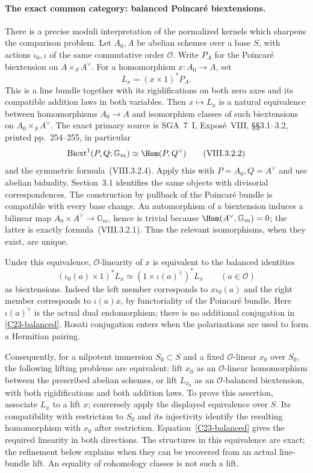 \documentclass[11pt]{article}
\theoremstyle{definition}\newtheorem{definition}[theorem]{Definition}\newtheorem{remark}[theorem]{Remark}
\begin{document}
\paragraph{The exact common category: balanced Poincar\'e biextensions.}
There is a precise moduli interpretation of the normalized
kernels which sharpens the comparison problem.  Let $A_0,A$
be abelian schemes over a base $S$, with actions $\iota_0,\iota$
of the same commutative order $\mathcal O$.  Write $P_A$
for the Poincar\'e biextension on $A\times_S A^\vee$.
For a homomorphism $x:A_0\to A$, set
\[
                   L_x=(x\times1)^*P_A.
\]
This is a line bundle together with its rigidifications on
both zero axes and its compatible addition laws in both
variables.  Then $x\mapsto L_x$ is a natural equivalence
between homomorphisms $A_0\to A$ and isomorphism classes of
such biextensions on $A_0\times_S A^\vee$.
The exact primary source is SGA~7~I, Expos\'e~VIII,
\S\S3.1--3.2, printed pp.~254--255, in particular
\[
 \operatorname{Biext}^1(P,Q;\mathbb G_m)
            \simeq\Hom(P,Q^\vee)
                         \tag{VIII.3.2.2}
\]
and the symmetric formula~(VIII.3.2.4).
Apply this with $P=A_0,Q=A^\vee$ and use abelian biduality.
Section~3.1 identifies the same objects with divisorial
correspondences.  The construction by pullback of the
Poincar\'e bundle is compatible with every base change.
An automorphism of a biextension induces a bilinear map
$A_0\times A^\vee\to\mathbb G_m$, hence is trivial because
$\Hom(A^\vee,\mathbb G_m)=0$; the latter is exactly
formula~(VIII.3.2.1).  Thus the relevant isomorphisms, when
they exist, are unique.

Under this equivalence, $\mathcal O$-linearity of $x$ is
equivalent to the balanced identities
\begin{equation}\label{C23-balanced}
 (\iota_0(a)\times1)^*L_x
       \simeq(1\times\iota(a)^\vee)^*L_x
                         \qquad(a\in\mathcal O)
\end{equation}
as biextensions.  Indeed the left member corresponds to
$x\iota_0(a)$ and the right member corresponds to
$\iota(a)x$, by functoriality of the Poincar\'e bundle.
Here $\iota(a)^\vee$ is the actual dual endomorphism;
there is no additional conjugation in
\eqref{C23-balanced}.  Rosati conjugation enters when the
polarizations are used to form a Hermitian pairing.

Consequently, for a nilpotent immersion $S_0\subset S$
and a fixed $\mathcal O$-linear $x_0$ over $S_0$, the
following lifting problems are equivalent: lift $x_0$ as an
$\mathcal O$-linear homomorphism between the prescribed
abelian schemes, or lift $L_{x_0}$ as an $\mathcal O$-balanced
biextension, with both rigidifications and both addition
laws.  To prove this assertion, associate $L_x$ to a lift
$x$; conversely apply the displayed equivalence over $S$.
Its compatibility with restriction to $S_0$ and its
injectivity identify the resulting homomorphism with $x_0$
after restriction.  Equation~\eqref{C23-balanced} gives
the required linearity in both directions.  The structures
in this equivalence are exact; the refinement below explains
when they can be recovered from an actual line-bundle lift.
An equality of cohomology classes is not such a lift.
\end{document}
